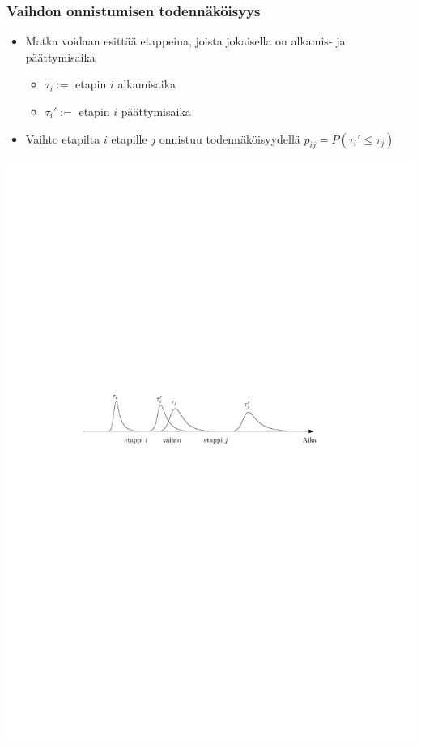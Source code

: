 \documentclass{beamer}
\begin{document}
    
    \begin{frame}
  \frametitle{Vaihdon onnistumisen todennäköisyys} 
  \begin{itemize}
   \item 
    Matka voidaan esittää etappeina, joista jokaisella on alkamis- ja päättymisaika
    \begin{itemize}
     \item 
     $\tau_i:=$ etapin $i$ alkamisaika
     \item 
     $\tau_i':=$ etapin $i$ päättymisaika
    \end{itemize}
    \item
    Vaihto etapilta $i$ etapille $j$ onnistuu todennäköisyydellä $p_{ij} = P(\tau_i' \leq \tau_j)$
\end{itemize}
     \begin{center}
     \includegraphics[scale=0.7]{transferprob02}
      \end{center}
    \end{frame} 
\end{document}
